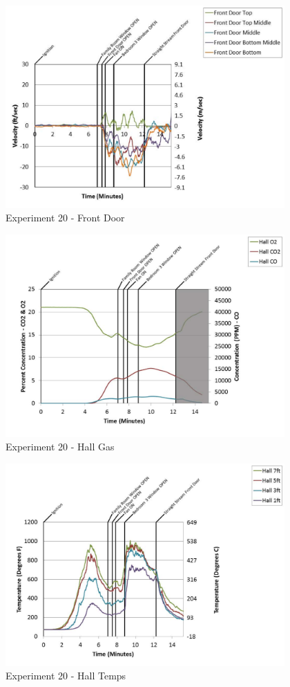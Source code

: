 \documentclass{article}
\begin{document}
\begin{appendices}
	\clearpage

	\begin{figure}[h!]
		\centering
		\includegraphics[height=3.05in]{0_Images/Results_Charts/Exp_20_Charts/FrontDoor.pdf}
		\caption{Experiment 20 - Front Door}
	\end{figure}
 

	\begin{figure}[h!]
		\centering
		\includegraphics[height=3.05in]{0_Images/Results_Charts/Exp_20_Charts/HallGas.pdf}
		\caption{Experiment 20 - Hall Gas}
	\end{figure}
 
	\clearpage

	\begin{figure}[h!]
		\centering
		\includegraphics[height=3.05in]{0_Images/Results_Charts/Exp_20_Charts/HallTemps.pdf}
		\caption{Experiment 20 - Hall Temps}
	\end{figure}
 


\end{appendices}
\end{document}
